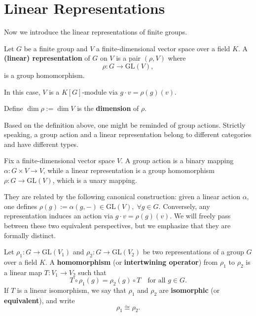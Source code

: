 \chapter{Linear Representations }

Now we introduce the linear representations of finite groups.
\begin{defn}
Let  \(G\) be a finite group and  \(V\) a finite-dimensional vector space over a field \(K\). 
A \textbf{(linear) representation} of \(G\) on \(V\) is a pair $(\rho,V)$ where
\[
\rho: G \longrightarrow \mathrm{GL}(V),
\]
is a group homomorphism.

In this case, \(V\) is a \(K[G]\)-module via \(g \cdot v = \rho(g)(v)\).


Define $\operatorname{dim} \rho :=\operatorname{dim} V$ is the \textbf{dimension} of $\rho$.
\end{defn}

\begin{remark}
Based on the definition above, one might be reminded of group actions. 
Strictly speaking, a group action and a linear representation belong to different categories and have different types.

Fix a finite-dimensional vector space $V$.
A group action is a binary mapping \( \alpha: G \times V \to V \), while a linear representation is a group homomorphism \( \rho: G \to \mathrm{GL}(V) \), which is a unary mapping.

They are related by the following canonical construction: given a linear action \( \alpha \), one defines \( \rho(g) := \alpha(g, -) \in \mathrm{GL}(V) ,\;\forall g\in G\). Conversely, any representation induces an action via \( g \cdot v = \rho(g)(v) \). We will freely pass between these two equivalent perspectives, but we emphasize that they are formally distinct.
\end{remark}

\begin{defn}
Let \(\rho_1: G \to \mathrm{GL}(V_1)\) and \(\rho_2: G \to \mathrm{GL}(V_2)\) be two representations of a group \(G\) over a field \(K\). A \textbf{homomorphism} (or \textbf{intertwining operator}) from \(\rho_1\) to \(\rho_2\) is a linear map \(T: V_1 \to V_2\) such that
\[
T \circ \rho_1(g) = \rho_2(g) \circ T \quad \text{for all } g \in G.
\]
If \(T\) is a linear isomorphism, we say that \(\rho_1\) and \(\rho_2\) are \textbf{isomorphic} (or \textbf{equivalent}), and write
\[
\rho_1 \cong \rho_2.
\]
\end{defn}


